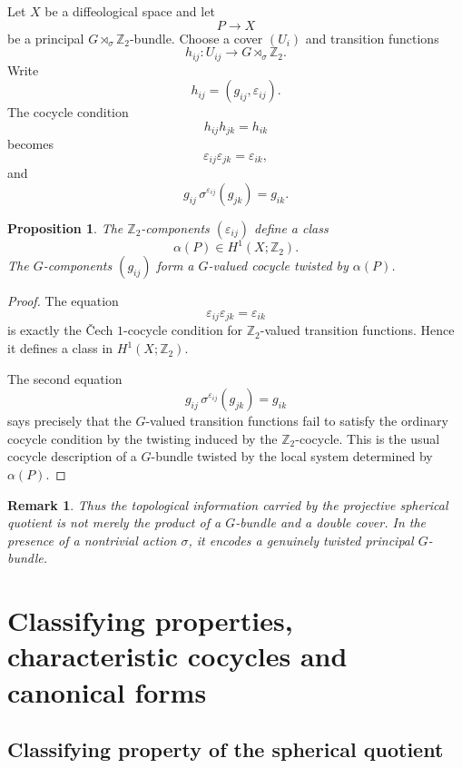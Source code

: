 \documentclass[11pt]{amsart}
\newtheorem{proposition}[definition]{Proposition}
\newtheorem{remark}[definition]{Remark}
\begin{document}
Let \(X\) be a diffeological space and let
\[
P\longrightarrow X
\]
be a principal \(G\rtimes_\sigma\mathbb Z_2\)-bundle. Choose a cover \((U_i)\) and transition functions
\[
h_{ij}:U_{ij}\longrightarrow G\rtimes_\sigma\mathbb Z_2.
\]
Write
\[
h_{ij}=(g_{ij},\varepsilon_{ij}).
\]
The cocycle condition
\[
h_{ij}h_{jk}=h_{ik}
\]
becomes
\[
\varepsilon_{ij}\varepsilon_{jk}=\varepsilon_{ik},
\]
and
\[
g_{ij}\,\sigma^{\varepsilon_{ij}}(g_{jk})=g_{ik}.
\]

\begin{proposition}
The \(\mathbb Z_2\)-components \((\varepsilon_{ij})\) define a class
\[
\alpha(P)\in H^1(X;\mathbb Z_2).
\]
The \(G\)-components \((g_{ij})\) form a \(G\)-valued cocycle twisted by \(\alpha(P)\).
\end{proposition}

\begin{proof}
The equation
\[
\varepsilon_{ij}\varepsilon_{jk}=\varepsilon_{ik}
\]
is exactly the Čech \(1\)-cocycle condition for \(\mathbb Z_2\)-valued transition functions. Hence it defines a class in \(H^1(X;\mathbb Z_2)\).

The second equation
\[
g_{ij}\,\sigma^{\varepsilon_{ij}}(g_{jk})=g_{ik}
\]
says precisely that the \(G\)-valued transition functions fail to satisfy the ordinary cocycle condition by the twisting induced by the \(\mathbb Z_2\)-cocycle. This is the usual cocycle description of a \(G\)-bundle twisted by the local system determined by \(\alpha(P)\).
\end{proof}

\begin{remark}
Thus the topological information carried by the projective spherical quotient is not merely the product of a \(G\)-bundle and a double cover. In the presence of a nontrivial action \(\sigma\), it encodes a genuinely twisted principal \(G\)-bundle.
\end{remark}

\section{Classifying properties, characteristic cocycles and canonical forms}
\label{sec:classifying-properties}

\subsection{Classifying property of the spherical quotient}
\end{document}
